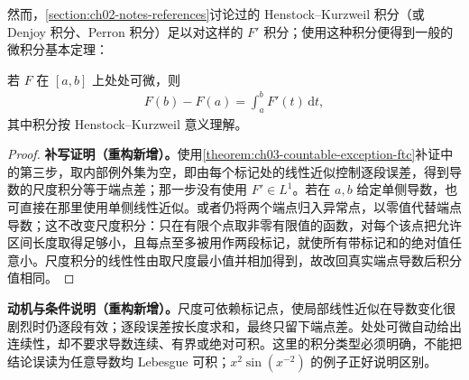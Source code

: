\documentclass[../../main.tex]{subfiles}%
\begin{document}
然而，\cref{section:ch02-notes-references}讨论过的 Henstock–Kurzweil 积分（或 Denjoy 积分、Perron 积分）足以对这样的 $F'$ 积分；使用这种积分便得到一般的微积分基本定理：
\begin{theorem}[一般的微积分基本定理]\label{theorem:ch03-hk-fundamental-calculus}
若 $F$ 在 $[a,b]$ 上处处可微，则
\begin{align*}
F(b)-F(a)=\int_a^bF'(t)\,\mathrm dt,
\end{align*}
其中积分按 Henstock–Kurzweil 意义理解。
\end{theorem}
\begin{proof}
\textbf{补写证明（重构新增）。}使用\cref{theorem:ch03-countable-exception-ftc}补证中的第三步，取内部例外集为空，即由每个标记处的线性近似控制逐段误差，得到导数的尺度积分等于端点差；那一步没有使用 $F'\in L^1$。若在 $a,b$ 给定单侧导数，也可直接在那里使用单侧线性近似。或者仍将两个端点归入异常点，以零值代替端点导数；这不改变尺度积分：只在有限个点取非零有限值的函数，对每个该点把允许区间长度取得足够小，且每点至多被用作两段标记，就使所有带标记和的绝对值任意小。尺度积分的线性性由取尺度最小值并相加得到，故改回真实端点导数后积分值相同。
\end{proof}
\begin{remark}
\textbf{动机与条件说明（重构新增）。}尺度可依赖标记点，使局部线性近似在导数变化很剧烈时仍逐段有效；逐段误差按长度求和，最终只留下端点差。处处可微自动给出连续性，却不要求导数连续、有界或绝对可积。这里的积分类型必须明确，不能把结论误读为任意导数均 Lebesgue 可积；$x^2\sin(x^{-2})$ 的例子正好说明区别。
\end{remark}
\end{document}

